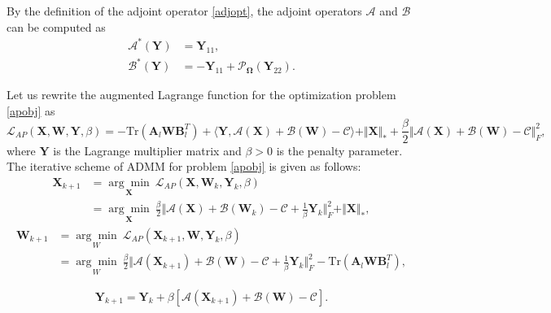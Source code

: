 \documentclass{article}
\begin{document}
{By the definition of the adjoint operator \eqref{adjopt}, the adjoint operators  $\mathcal{A}$ and $\mathcal{B}$ can be computed as 
\begin{equation}
    \begin{aligned}
        \mathcal{A}^*(\mathbf Y) & = \mathbf Y_{11}, \\
        \mathcal{B}^*(\mathbf Y) & = -\mathbf Y_{11} + \mathcal{P}_{\mathbf\Omega}(\mathbf Y_{22}).
    \end{aligned}\label{optab}
\end{equation}

Let us rewrite the augmented Lagrange function for the optimization problem \eqref{apobj} as 
\begin{equation}
\mathcal{L}_{AP}(\mathbf X,\mathbf W,\mathbf Y,\beta) = -\text{Tr}(\mathbf A_l\mathbf W\mathbf B_l^T) + \langle\mathbf Y, \mathcal{A}(\mathbf X)+\mathcal{B}(\mathbf W) -\mathcal{C} \rangle + \Vert\mathbf X \Vert_* + \frac{\beta}{2}\Vert \mathcal{A}(\mathbf X)+\mathcal{B}(\mathbf W) -\mathcal{C} \Vert^2_F,
\end{equation}
where $\mathbf Y$ is the Lagrange multiplier matrix and $\beta >0$ is the penalty parameter. The iterative scheme of ADMM for problem \eqref{apobj} is given as follows:
    \begin{align}
        \mathbf X_{k+1} & = \underset{\mathbf X}{\arg\min}\  \mathcal{L}_{AP}(\mathbf X, \mathbf W_k,\mathbf Y_k,\beta) \nonumber\\
        & = \underset{\mathbf X}{\arg\min}\ \frac{\beta}{2}\Vert \mathcal{A}(\mathbf X) + \mathcal{B}(\mathbf W_k) - \mathcal{C} + \frac{1}{\beta}\mathbf Y_{k} \Vert_F^2 + \Vert\mathbf X \Vert_*,
        \label{apx}
    \end{align}
    \begin{align}
        \mathbf W_{k+1} & = \underset{W}{\arg\min}\  \mathcal{L}_{AP}(\mathbf X_{k+1},\mathbf W,\mathbf Y_k,\beta)  \nonumber \\
        & = \underset{W}{\arg\min}\ \frac{\beta}{2}\Vert \mathcal{A}(\mathbf X_{k+1}) + \mathcal{B}(\mathbf W) - \mathcal{C} + \frac{1}{\beta}\mathbf Y_{k} \Vert_F^2 -\text{Tr}(\mathbf A_l\mathbf W\mathbf B_l^T),
        \label{apw}
    \end{align}

\begin{equation}
    \mathbf Y_{k+1} = \mathbf Y_{k}+\beta[\mathcal{A}(\mathbf X_{k+1})+\mathcal{B}(\mathbf W)-\mathcal{C}].
    \label{apy}
\end{equation}

}
\end{document}
